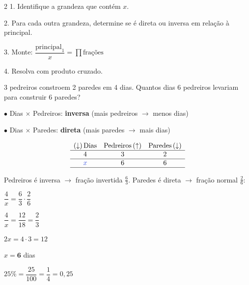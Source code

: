 \documentclass[12pt]{article}
\begin{document}
\begin{multicols}{2}
1. Identifique a grandeza que contém $x$.

2. Para cada outra grandeza, determine se é direta ou inversa em relação à principal.

3. Monte: $\dfrac{\text{principal}_1}{x} = \prod \text{frações}$

4. Resolva com produto cruzado.


3 pedreiros constroem 2 paredes em 4 dias. Quantos dias 6 pedreiros levariam para construir 6 paredes?

$\bullet$ Dias $\times$ Pedreiros: \textbf{inversa} (mais pedreiros $\rightarrow$ menos dias)

$\bullet$ Dias $\times$ Paredes: \textbf{direta} (mais paredes $\rightarrow$ mais dias)

$$\begin{array}[t]{ccc}
(\downarrow)\,\text{Dias} & \text{Pedreiros}\,(\uparrow) & \text{Paredes}\,(\downarrow) \\ \hline
4 & 3 & 2 \\ \hline
\textcolor{iris}{x} & 6 & 6 \\ \hline
\end{array}$$

\vspace{0.2cm}

Pedreiros é inversa $\rightarrow$ fração invertida $\frac{6}{3}$.
Paredes é direta $\rightarrow$ fração normal $\frac{2}{6}$:

\vspace{6px}
$\dfrac{4}{x} = \dfrac{6}{3} \cdot \dfrac{2}{6}$ \vspace{6px}

$\dfrac{4}{x} = \dfrac{12}{18} = \dfrac{2}{3}$ \vspace{6px}

$2x = 4 \cdot 3 = 12$ \vspace{6px}

$x = \textbf{6}$ dias






$25\% = \dfrac{25}{100} = \dfrac{1}{4} = 0{,}25$


\end{multicols}
\end{document}
